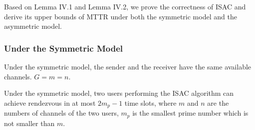 \documentclass[journal]{IEEEtran}
\begin{document}
\par Based on Lemma IV.1 and Lemma IV.2, we prove the correctness of ISAC and derive its upper bounds of MTTR under both the symmetric model and the asymmetric model.
\subsubsection{Under the Symmetric Model}
Under the symmetric model, the sender and the receiver have the same available channels. $G=m=n$.
\newtheorem{theorem}{Theorem}
\begin{theoremn}
 Under the symmetric model, two users performing the ISAC algorithm can achieve rendezvous in at most $2m_p-1$ time slots, where $m$ and $n$ are the numbers of channels of the two users, $m_p$ is the smallest prime number which is not smaller than $m$.
\end{theoremn}
\end{document}
